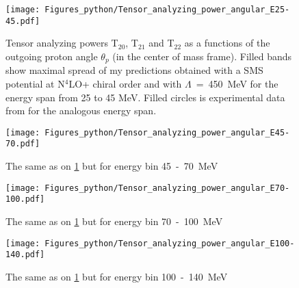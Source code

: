     \begin{figure}[h]
        \begin{center}
        \texttt{[image: Figures\_python/Tensor\_analyzing\_power\_angular\_E25-45.pdf]}
        \end{center}
        \caption{Tensor analyzing powers T$_{20}$, T$_{21}$ and T$_{22}$ as a functions of the
        outgoing proton angle $\theta_p$ (in the center of mass frame).
        Filled bands show maximal spread of my predictions obtained with a 
        SMS potential at N$^4$LO+ chiral order and with $\Lambda$~=~450~MeV
        for the energy span from 25 to 45 MeV. Filled circles is experimental data
        from \cite{rachek2007} for the analogous energy span.}
        \label{tensor_angular_25-45}
    \end{figure}

    \begin{figure}[h]
        \begin{center}
        \texttt{[image: Figures\_python/Tensor\_analyzing\_power\_angular\_E45-70.pdf]}
        \end{center}
        \caption{The same as on \ref*{tensor_angular_25-45} but for energy bin 45~-~70~MeV}
        \label{tensor_angular_45-70}
    \end{figure}

    \begin{figure}[h]
        \begin{center}
        \texttt{[image: Figures\_python/Tensor\_analyzing\_power\_angular\_E70-100.pdf]}
        \end{center}
        \caption{The same as on \ref*{tensor_angular_25-45} but for energy bin 70~-~100~MeV}
        \label{tensor_angular_70-100}
    \end{figure}

    \begin{figure}[h]
        \begin{center}
        \texttt{[image: Figures\_python/Tensor\_analyzing\_power\_angular\_E100-140.pdf]}
        \end{center}
        \caption{The same as on \ref*{tensor_angular_25-45} but for energy bin 100~-~140~MeV}
        \label{tensor_angular_70-100}
    \end{figure}
        